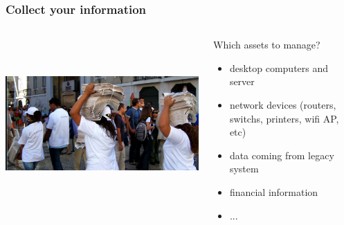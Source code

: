 \documentclass{beamer}
\begin{document}
\begin{frame}

    \frametitle{Collect your information}

 \begin{columns}
 \begin{column}{0.34\textwidth}
    \includegraphics[height=6.5cm]{pics/information.jpg}
 \end{column}
 \begin{column}{0.90\textwidth}
    \begin{block}{Which assets to manage?}
        \begin{itemize}
            \item desktop computers and server
            \item network devices (routers, switchs, printers, wifi AP, etc)
            \item data coming from legacy system
            \item financial information
            \item ...
        \end{itemize}
    \end{block}

 \end{column}
\end{columns}


\end{frame}
\end{document}
